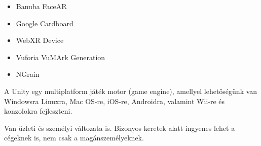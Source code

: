 \begin{itemize}
\item Banuba FaceAR
\item Google Cardboard
\item WebXR Device 
\item Vuforia VuMArk Generation
\item NGrain
\end{itemize}


A Unity egy multiplatform játék motor (game engine), amellyel lehetőségünk van Windowsra Linuxra, Mac OS-re, iOS-re, Androidra, valamint Wii-re és konzolokra fejleszteni.

Van üzleti és személyi változata is. Bizonyos keretek alatt ingyenes lehet a cégeknek is, nem csak a magánszemélyeknek.
